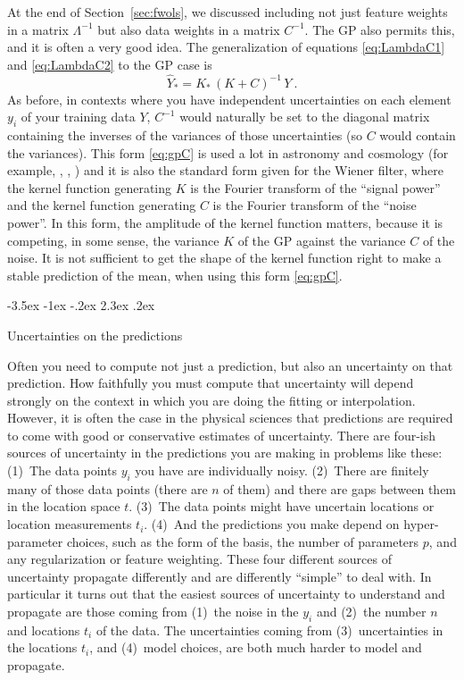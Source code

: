 \documentclass[12pt,letterpaper]{article}
\makeatletter
\renewcommand\section{\@startsection {section}{1}{\z@}%
  {-3.5ex \@plus -1ex \@minus -.2ex}%
  {2.3ex \@plus.2ex}%
  {\raggedright\normalfont\Large\bfseries}}
\newcommand{\sectionname}{Section}
\makeatother
\begin{document}
At the end of \sectionname~\ref{sec:fwols}, we discussed including not just feature weights in a matrix $\Lambda^{-1}$ but also data weights in a matrix $C^{-1}$. The GP also permits this, and it is often a very good idea. The generalization of equations \eqref{eq:LambdaC1} and \eqref{eq:LambdaC2} to the GP case is 
\begin{equation}\label{eq:gpC}
    \hat{Y}_\ast = K_\ast\,(K + C)^{-1}\,Y
    ~.
\end{equation}
As before, in contexts where you have independent uncertainties on each element $y_i$ of your training data $Y$, $C^{-1}$ would naturally be set to the diagonal matrix containing the inverses of the variances of those uncertainties (so $C$ would contain the variances).
This form \eqref{eq:gpC} is used a lot in astronomy and cosmology (for example, \citealt{zaroubi}, \citealt{aigrain}, \citealt{celerite}) and it is also the standard form given for the Wiener filter, where the kernel function generating $K$ is the Fourier transform of the ``signal power'' and the kernel function generating $C$ is the Fourier transform of the ``noise power''.
In this form, the amplitude of the kernel function matters, because it is competing, in some sense, the variance $K$ of the GP against the variance $C$ of the noise.
It is not sufficient to get the shape of the kernel function right to make a stable prediction of the mean, when using this form \eqref{eq:gpC}.

\section{Uncertainties on the predictions}\label{sec:uncertainty}

Often you need to compute not just a prediction, but also an uncertainty on that prediction.
How faithfully you must compute that uncertainty will depend strongly on the context in which you are doing the fitting or interpolation.
However, it is often the case in the physical sciences that predictions are required to come with good or conservative estimates of uncertainty.
There are four-ish sources of uncertainty in the predictions you are making in problems like these:
(1)~The data points $y_i$ you have are individually noisy.
(2)~There are finitely many of those data points (there are $n$ of them) and there are gaps between them in the location space $t$.
(3)~The data points might have uncertain locations or location measurements $t_i$.
(4)~And the predictions you make depend on hyper-parameter choices, such as the form of the basis, the number of parameters $p$, and any regularization or feature weighting.
These four different sources of uncertainty propagate differently and are differently ``simple'' to deal with.
In particular it turns out that the easiest sources of uncertainty to understand and propagate are those coming from (1)~the noise in the $y_i$ and (2)~the number $n$ and locations $t_i$ of the data.
The uncertainties coming from (3)~uncertainties in the locations $t_i$, and (4)~model choices, are both much harder to model and propagate.
\end{document}
